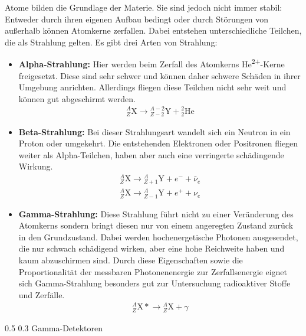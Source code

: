 \documentclass[german, %
parskip=full, %
bibliography=totoc, %
]{scrartcl}
\makeatletter
\renewcommand\subsection{\@startsection 
   {subsection}{2}{0mm}%
   {0.5\baselineskip}%
   {0.3\baselineskip}%
   {\bfseries\sffamily\large}%
   }
\makeatother
\begin{document}
Atome bilden die Grundlage der Materie. Sie sind jedoch nicht immer stabil: Entweder durch ihren eigenen Aufbau bedingt oder durch Störungen von außerhalb können Atomkerne zerfallen. Dabei entstehen unterschiedliche Teilchen, die als Strahlung gelten. Es gibt drei Arten von Strahlung:
\begin{itemize}
\item \textbf{Alpha-Strahlung:} Hier werden beim Zerfall des Atomkerns He\textsuperscript{2+}-Kerne freigesetzt. Diese sind sehr schwer und können daher schwere Schäden in ihrer Umgebung anrichten. Allerdings fliegen diese Teilchen nicht sehr weit und können gut abgeschirmt werden.
\begin{align}
{}^A_Z\mathrm{X} \to {}^{A-2}_{Z-2}\mathrm{Y} + {}^2_2\mathrm{He} \label{for:alpha}
\end{align}
\item \textbf{Beta-Strahlung:} Bei dieser Strahlungsart wandelt sich ein Neutron in ein Proton oder umgekehrt. Die entstehenden Elektronen oder Positronen fliegen weiter als Alpha-Teilchen, haben aber auch eine verringerte schädingende Wirkung.
\begin{align}
{}^A_Z\mathrm{X} \to {}^{A}_{Z+1}\mathrm{Y} + e^- + \bar \nu_e \label{for:beta-} \\ 
{}^A_Z\mathrm{X} \to {}^{A}_{Z-1}\mathrm{Y} + e^+ + \nu_e \label{for:beta+}
\end{align}
\item \textbf{Gamma-Strahlung:} Diese Strahlung führt nicht zu einer Veränderung des Atomkerns sondern bringt diesen nur von einem angeregten Zustand zurück in den Grundzustand. Dabei werden hochenergetische Photonen ausgesendet, die nur schwach schädigend wirken, aber eine hohe Reichweite haben und kaum abzuschirmen sind. Durch diese Eigenschaften sowie die Proportionalität der messbaren Photonenenergie zur Zerfallsenergie eignet sich Gamma-Strahlung besonders gut zur Untersuchung radioaktiver Stoffe und Zerfälle.
\begin{align}
{}^A_Z\mathrm{X*} \to {}^{A}_{Z}\mathrm{X} + \gamma \label{for:gamma}
\end{align}
\end{itemize}

\subsection{Gamma-Detektoren}
\end{document}
